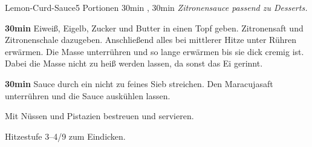 \documentclass[../recipe-collections/cooking.tex]{subfiles}
\begin{document}
\begin{recipe}{Lemon-Curd-Sauce}{5 Portionen }{30min , 30min }
  \freeform{}\textit{Zitronensauce passend zu Desserts.}


  \textbf{30min}
  Eiweiß, Eigelb, Zucker und Butter in einen Topf geben.
  Zitronensaft und Zitronenschale dazugeben.
  Anschließend alles bei mittlerer Hitze unter Rühren erwärmen.
  Die Masse unterrühren und so lange erwärmen bis sie dick cremig ist.
  Dabei die Masse nicht zu heiß werden lassen, da sonst das Ei gerinnt.


  \textbf{30min}
  Sauce durch ein nicht zu feines Sieb streichen.
  Den Maracujasaft unterrühren und die Sauce auskühlen lassen.


  Mit Nüssen und Pistazien bestreuen und servieren.

  \freeform{}\hrulefill{}

  \freeform{}
  Hitzestufe 3–4/9 zum Eindicken.

\end{recipe}
\end{document}
